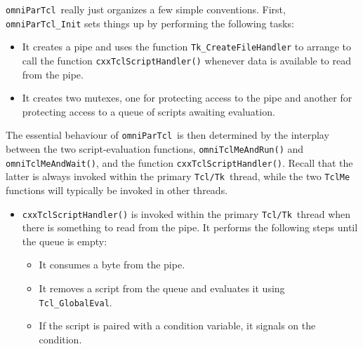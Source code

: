 \documentclass[11pt,twoside,onecolumn]{article}
\def\omniParTcl{{\tt omniParTcl}}
\def\tcltk{{\tt Tcl/Tk}}
\begin{document}
\omniParTcl\ really just organizes a few simple conventions.   
First, {\tt omniParTcl\_Init} sets things up by
performing the following tasks:

\begin{itemize}
\item
It creates a pipe and uses the function {\tt Tk\_CreateFileHandler} to
arrange to call the function {\tt cxxTclScriptHandler()} whenever data
is available to read from the pipe.

\item
It creates two mutexes, one for protecting access to the pipe and 
another for protecting access to a queue of scripts awaiting evaluation.
\end{itemize}

\noindent
The essential behaviour of \omniParTcl\ is then determined by the
interplay between the two script-evaluation functions,
{\tt omniTclMeAndRun()} and {\tt omniTclMeAndWait()}, and 
the function {\tt cxxTclScriptHandler()}.  Recall that the latter
is always invoked within the primary \tcltk\ thread, while the
two {\tt TclMe} functions will typically be invoked in
other threads.

\begin{itemize}


\item {\tt cxxTclScriptHandler()} is invoked within the primary
\tcltk\ thread when there is something to read from the pipe.  It
performs the following steps until the queue is empty:

\begin{itemize}

\item It consumes a byte from the pipe.

\item It removes a script from the queue and
evaluates it using {\tt Tcl\_GlobalEval}.

\item If the script is paired with a condition variable, 
it signals on the condition.
\end{itemize}

\end{itemize}
\end{document}
